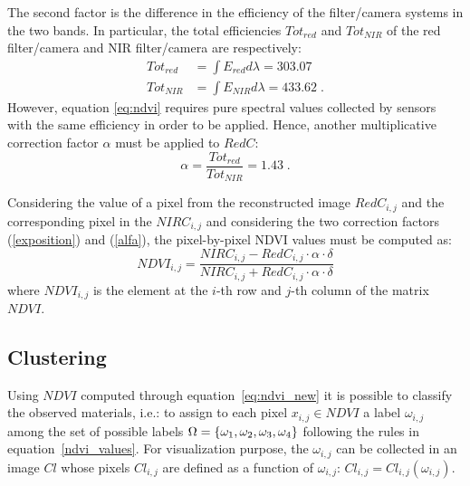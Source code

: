 \documentclass[a4paper, 10pt, conference]{ieeeconf}      %
\begin{document}
The second factor is the difference in the efficiency of the filter/camera systems in the two bands.
In particular, the total efficiencies $Tot_{red}$ and $Tot_{NIR}$ of the red filter/camera and NIR filter/camera are respectively:
%
\begin{eqnarray}  \label{integral}
Tot_{red} &=  \int E_{red} d\lambda =303.07\nonumber\\
Tot_{NIR} &=  \int E_{NIR} d\lambda=433.62 \;.
\end{eqnarray}
%
However, equation \eqref{eq:ndvi} requires pure spectral values collected by sensors with the same efficiency in order to be applied.
Hence, another multiplicative correction factor $\alpha$ must be applied to $RedC$:
%
\begin{equation}\label{alfa}
\alpha=\frac{Tot_{red}}{Tot_{NIR}}=1.43 \;.
\end{equation}

Considering the value of a pixel from the reconstructed image ${RedC}_{i,j}$  and the corresponding  pixel in the  ${NIRC}_{i,j}$ and considering the two correction factors (\ref{exposition}) and (\ref{alfa}), the pixel-by-pixel NDVI values must be computed as:
%
\begin{equation} \label{eq:ndvi_new}
NDVI_{i,j}=\frac{NIRC_{i,j}-RedC_{i,j}\cdot \alpha \cdot \delta}{NIRC_{i,j}+RedC_{i,j}\cdot \alpha\cdot \delta}
\end{equation}
where $NDVI_{i,j}$ is the element at the $i$-th row and $j$-th column of the matrix $NDVI$.

\subsection{Clustering}\label{sec:clustering}

Using $NDVI$ computed through equation~\eqref{eq:ndvi_new} it is possible to classify the observed materials, i.e.: to assign to each pixel $x_{i,j} \in NDVI$ a label $\omega_{i,j}$ among the set of possible labels $\Omega=\{\rm{\omega_1, \omega_2, \omega_3, \omega_4}\}$ following the rules in equation~\eqref{ndvi_values}.
For visualization purpose, the $\omega_{i,j}$ can be collected in an image $Cl$ whose pixels $Cl_{i,j}$ are defined as a function of $\omega_{i,j}$: $Cl_{i,j}=Cl_{i,j}(\omega_{i,j})$.
\end{document}
